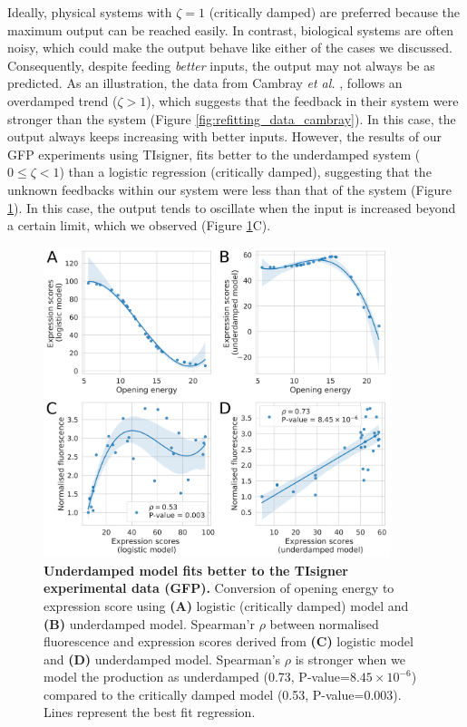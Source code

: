 Ideally, physical systems with $\zeta = 1$ (critically damped) are preferred because the maximum output can be reached easily. In contrast, biological systems are often noisy, which could make the output behave like either of the cases we discussed. Consequently, despite feeding \textit{better} inputs, the output may not always be as predicted. As an illustration, the data from Cambray \textit{et al.} \cite{Cambray2018-kn}, follows an overdamped trend ($\zeta > 1$), which suggests that the feedback in their system were stronger than the system (Figure \ref{fig:refitting_data_cambray}). In this case, the output always keeps increasing with better inputs. However, the results of our GFP experiments using TIsigner, fits better to the underdamped system ($0 \leq \zeta < 1 $) than a logistic regression (critically damped), suggesting that the unknown feedbacks within our system were less than that of the system (Figure \ref{fig:refitting_data_tisigner}). In this case, the output tends to oscillate when the input is increased beyond a certain limit, which we observed (Figure \ref{fig:refitting_data_tisigner}C).


\begin{figure}[htbp!]
\center
\includegraphics[width=0.9\textwidth]{chapters/Discussion/Figures/refitting_tisigner.png}
\caption[Underdamped model fits better to the TIsigner experimental data (GFP).]{\textbf{Underdamped model fits better to the TIsigner experimental data (GFP).} Conversion of opening energy to expression score using \textbf{(A)} logistic (critically damped) model and  \textbf{(B)} underdamped model. Spearman'r $\rho$ between normalised fluorescence and expression scores derived from \textbf{(C)} logistic model and \textbf{(D)} underdamped model. Spearman's $\rho$ is stronger when we model the production as underdamped (0.73, P-value=$8.45\times 10^{-6}$) compared to the critically damped model (0.53, P-value=0.003). Lines represent the best fit regression.}%
\label{fig:refitting_data_tisigner}
\end{figure}

